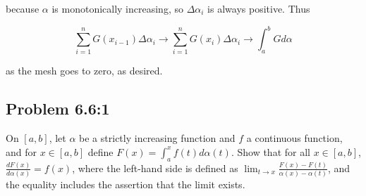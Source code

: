 \documentclass{article}
\begin{document}
because $\alpha$ is monotonically increasing, so $\Delta \alpha_i$ is always positive. Thus

\[
\sum_{i=1}^n G(x_{i-1}) \Delta \alpha_i \rightarrow \sum_{i=1}^n G(x_i) \Delta \alpha_i \rightarrow \int_a^bGd\alpha
\]

as the mesh goes to zero, as desired.

\subsection*{Problem 6.6:1}

On $[a, b]$, let $\alpha$ be a strictly increasing function and $f$ a continuous function, and for $x \in [a, b]$ define $F(x) = \int_a^x f(t) d\alpha(t)$. Show that for all $x \in [a, b]$, $\frac{dF(x)}{d \alpha(x)} = f(x)$, where the left-hand side is defined as $\lim_{t \to x} \frac{F(x) - F(t)}{\alpha(x) - \alpha(t)}$, and the equality includes the assertion that the limit exists.
\end{document}
